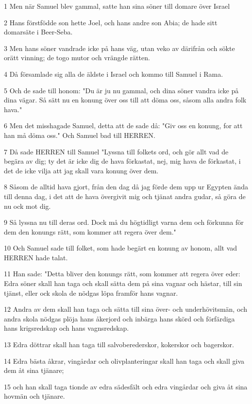 \par 1 Men när Samuel blev gammal, satte han sina söner till domare över Israel
\par 2 Hans förstfödde son hette Joel, och hans andre son Abia; de hade sitt domarsäte i Beer-Seba.
\par 3 Men hans söner vandrade icke på hans väg, utan veko av därifrån och sökte orätt vinning; de togo mutor och vrängde rätten.
\par 4 Då församlade sig alla de äldste i Israel och kommo till Samuel i Rama.
\par 5 Och de sade till honom: "Du är ju nu gammal, och dina söner vandra icke på dina vägar. Så sätt nu en konung över oss till att döma oss, såsom alla andra folk hava."
\par 6 Men det misshagade Samuel, detta att de sade då: "Giv oss en konung, for att han må döma oss." Och Samuel bad till HERREN.
\par 7 Då sade HERREN till Samuel "Lyssna till folkets ord, och gör allt vad de begära av dig; ty det är icke dig de hava förkastat, nej, mig hava de förkastat, i det de icke vilja att jag skall vara konung över dem.
\par 8 Såsom de alltid hava gjort, från den dag då jag förde dem upp ur Egypten ända till denna dag, i det att de hava övergivit mig och tjänat andra gudar, så göra de nu ock mot dig.
\par 9 Så lyssna nu till deras ord. Dock må du högtidligt varna dem och förkunna för dem den konungs rätt, som kommer att regera över dem."
\par 10 Och Samuel sade till folket, som hade begärt en konung av honom, allt vad HERREN hade talat.
\par 11 Han sade: "Detta bliver den konungs rätt, som kommer att regera över eder: Edra söner skall han taga och skall sätta dem på sina vagnar och hästar, till sin tjänst, eller ock skola de nödgas löpa framför hans vagnar.
\par 12 Andra av dem skall han taga och sätta till sina över- och underhövitsmän, och andra skola nödgas plöja hans åkerjord och inbärga hans skörd och förfärdiga hans krigsredskap och hans vagnsredskap.
\par 13 Edra döttrar skall han taga till salvoberederskor, kokerskor och bagerskor.
\par 14 Edra bästa åkrar, vingårdar och olivplanteringar skall han taga och skall giva dem åt sina tjänare;
\par 15 och han skall taga tionde av edra sädesfält och edra vingårdar och giva åt sina hovmän och tjänare.
